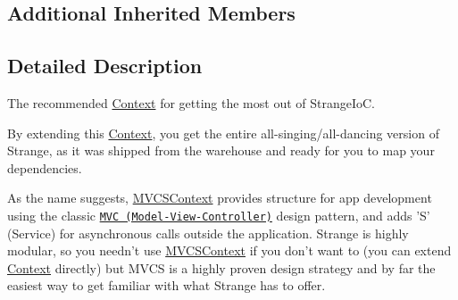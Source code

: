 \subsection*{Additional Inherited Members}


\subsection{Detailed Description}
The recommended \hyperlink{classstrange_1_1extensions_1_1context_1_1impl_1_1_context}{Context} for getting the most out of Strange\-Io\-C. 

By extending this \hyperlink{classstrange_1_1extensions_1_1context_1_1impl_1_1_context}{Context}, you get the entire all-\/singing/all-\/dancing version of Strange, as it was shipped from the warehouse and ready for you to map your dependencies.

As the name suggests, \hyperlink{classstrange_1_1extensions_1_1context_1_1impl_1_1_m_v_c_s_context}{M\-V\-C\-S\-Context} provides structure for app development using the classic \href{http://en.wikipedia.org/wiki/Model%E2%80%93view%E2%80%93controller}{\tt M\-V\-C (Model-\/\-View-\/\-Controller)} design pattern, and adds 'S' (Service) for asynchronous calls outside the application. Strange is highly modular, so you needn't use \hyperlink{classstrange_1_1extensions_1_1context_1_1impl_1_1_m_v_c_s_context}{M\-V\-C\-S\-Context} if you don't want to (you can extend \hyperlink{classstrange_1_1extensions_1_1context_1_1impl_1_1_context}{Context} directly) but M\-V\-C\-S is a highly proven design strategy and by far the easiest way to get familiar with what Strange has to offer.

